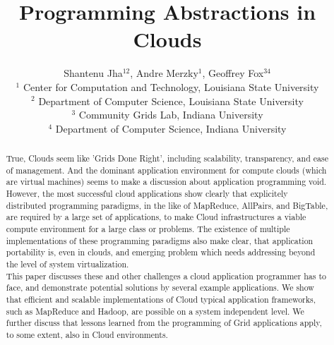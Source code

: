 \documentclass{article}
\begin{document}
\title{\large Programming Abstractions in Clouds}

\author{Shantenu Jha$^{12}$,
        Andre Merzky$^{1}$,
        Geoffrey Fox$^{34}$\\[1em]
        $^1$ \small
          Center for Computation and Technology, 
          Louisiana State University\\[-0.3em]
        $^2$ \small
          Department of Computer Science, 
          Louisiana State University\\[-0.3em]
        $^3$ \small
          Community Grids Lab, 
          Indiana University\\[-0.3em]
        $^4$ \small
          Department of Computer Science, 
          Indiana University
       }

\maketitle

\begin{abstract}

  \noindent
  True, Clouds seem like 'Grids Done Right', including scalability,
  transparency, and ease of management.  And the dominant application
  environment for compute clouds (which are virtual machines) seems to
  make a discussion about application programming void.  However, the
  most successful cloud applications show clearly that explicitely
  distributed programming paradigms, in the like of MapReduce,
  AllPairs, and BigTable, are required by a large set of applications,
  to make Cloud infrastructures a viable compute environment for a
  large class or problems.  The existence of multiple implementations
  of these programming paradigms also make clear, that application
  portability is, even in clouds, and emerging problem which needs
  addressing beyond the level of system virtualization.\\[-0.5em]

  \noindent
  This paper discusses these and other challenges a cloud application
  programmer has to face, and demonstrate potential solutions by
  several example applications.  We show that efficient and scalable
  implementations of Cloud typical application frameworks, such as
  MapReduce and Hadoop, are possible on a system independent level.
  We further discuss that lessons learned from the programming of Grid
  applications apply, to some extent, also in Cloud environments.

\end{abstract}
\end{document}
